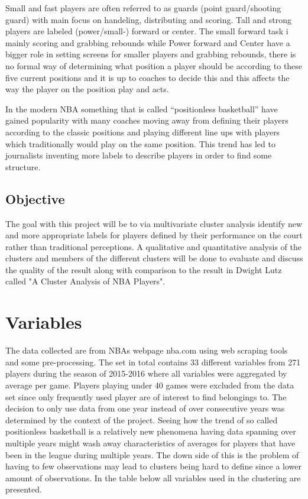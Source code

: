 \documentclass{article}
\begin{document}
Small and fast players are often referred to as guards (point guard/shooting guard) with main focus on handeling, distributing and scoring. Tall and strong players are labeled (power/small-) forward or center. The small forward task i mainly scoring and grabbing rebounds while Power forward and Center have a bigger role in setting screens for smaller players and grabbing rebounds, there is no formal way of determining what position a player should be according to these five current positions and it is up to coaches to decide this and this affects the way the player on the position play and acts.


In the modern NBA something that is called “positionless basketball” have gained popularity with many coaches moving away from defining their players according to the classic positions and playing different line ups with players which traditionally would play on the same position.\cite{positonbasketball} This trend has led to journalists inventing more labels to describe players in order to find some structure.



\subsection{Objective}


The goal with this project will be to via multivariate cluster analysis identify new and more appropriate labels for players defined by their performance on the court rather than traditional perceptions. A qualitative and quantitative analysis of the clusters and members of the different clusters will be done to evaluate and discuss the quality of the result along with comparison to the result in Dwight Lutz called "A Cluster Analysis of NBA Players".



\section{Variables}

The data collected are from NBAs webpage nba.com using web scraping tools and some pre-processing. The set in total contains 33 different variables from 271 players during the season of 2015-2016 where all variables were aggregated by average per game. Players playing under 40 games were excluded from the data set since only frequently used player are of interest to find belongings to. The decision to only use data from one year instead of over consecutive years was determined by the context of the project. Seeing how the trend of so called positionless basketball is a relatively new phenomena having data spanning over multiple years might wash away characteristics of averages for players that have been in the league during multiple years. The down side of this is the problem of having to few observations may lead to clusters being hard to define since a lower amount of observations. In the table below all variables used in the clustering are presented.
\end{document}

